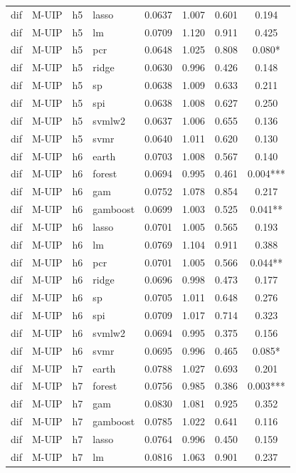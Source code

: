 \begin{ThreePartTable}
\begin{longtable}[t]{llclcccc}
dif & M-UIP & h5 & lasso & 0.0637 & 1.007 & 0.601 & 0.194\\
dif & M-UIP & h5 & lm & 0.0709 & 1.120 & 0.911 & 0.425\\
dif & M-UIP & h5 & pcr & 0.0648 & 1.025 & 0.808 & 0.080*\\
dif & M-UIP & h5 & ridge & 0.0630 & 0.996 & 0.426 & 0.148\\
dif & M-UIP & h5 & sp & 0.0638 & 1.009 & 0.633 & 0.211\\
dif & M-UIP & h5 & spi & 0.0638 & 1.008 & 0.627 & 0.250\\
dif & M-UIP & h5 & svmlw2 & 0.0637 & 1.006 & 0.655 & 0.136\\
dif & M-UIP & h5 & svmr & 0.0640 & 1.011 & 0.620 & 0.130\\
\addlinespace
dif & M-UIP & h6 & earth & 0.0703 & 1.008 & 0.567 & 0.140\\
dif & M-UIP & h6 & forest & 0.0694 & 0.995 & 0.461 & 0.004***\\
dif & M-UIP & h6 & gam & 0.0752 & 1.078 & 0.854 & 0.217\\
dif & M-UIP & h6 & gamboost & 0.0699 & 1.003 & 0.525 & 0.041**\\
dif & M-UIP & h6 & lasso & 0.0701 & 1.005 & 0.565 & 0.193\\
dif & M-UIP & h6 & lm & 0.0769 & 1.104 & 0.911 & 0.388\\
dif & M-UIP & h6 & pcr & 0.0701 & 1.005 & 0.566 & 0.044**\\
dif & M-UIP & h6 & ridge & 0.0696 & 0.998 & 0.473 & 0.177\\
dif & M-UIP & h6 & sp & 0.0705 & 1.011 & 0.648 & 0.276\\
dif & M-UIP & h6 & spi & 0.0709 & 1.017 & 0.714 & 0.323\\
dif & M-UIP & h6 & svmlw2 & 0.0694 & 0.995 & 0.375 & 0.156\\
dif & M-UIP & h6 & svmr & 0.0695 & 0.996 & 0.465 & 0.085*\\
\addlinespace
dif & M-UIP & h7 & earth & 0.0788 & 1.027 & 0.693 & 0.201\\
dif & M-UIP & h7 & forest & 0.0756 & 0.985 & 0.386 & 0.003***\\
dif & M-UIP & h7 & gam & 0.0830 & 1.081 & 0.925 & 0.352\\
dif & M-UIP & h7 & gamboost & 0.0785 & 1.022 & 0.641 & 0.116\\
dif & M-UIP & h7 & lasso & 0.0764 & 0.996 & 0.450 & 0.159\\
dif & M-UIP & h7 & lm & 0.0816 & 1.063 & 0.901 & 0.237\\

\end{longtable}
\end{ThreePartTable}
